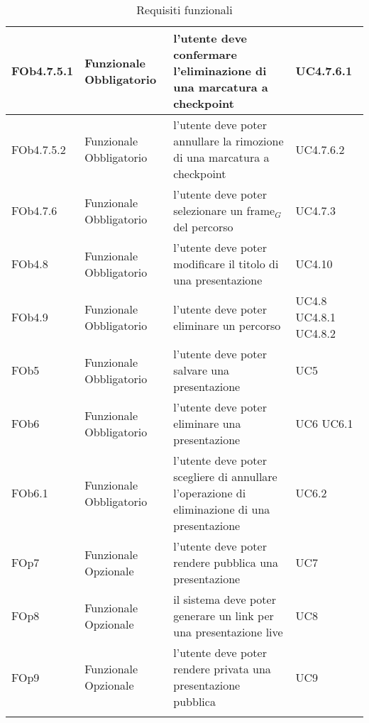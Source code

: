 \begin{longtable}{|l|p{2.5cm}|p{5cm}|p{3.5cm}|}
\hline
FOb4.7.5.1 & Funzionale \linebreak Obbligatorio & l'utente deve confermare l'eliminazione di una marcatura a checkpoint & UC4.7.6.1 \linebreak  \\
\hline
FOb4.7.5.2 & Funzionale \linebreak Obbligatorio & l'utente deve poter annullare la rimozione di una marcatura a checkpoint & UC4.7.6.2 \linebreak  \\
\hline
FOb4.7.6 & Funzionale \linebreak Obbligatorio & l'utente deve poter selezionare un frame$_G$ del percorso & UC4.7.3 \linebreak  \\
\hline
FOb4.8 & Funzionale \linebreak Obbligatorio & l'utente deve poter modificare il titolo di una presentazione & UC4.10 \linebreak  \\
\hline
FOb4.9 & Funzionale \linebreak Obbligatorio & l'utente deve poter eliminare un percorso & UC4.8 \linebreak  UC4.8.1 \linebreak  UC4.8.2 \linebreak  \\
\hline
FOb5 & Funzionale \linebreak Obbligatorio & l'utente deve poter salvare una presentazione & UC5 \linebreak \\
\hline
FOb6 & Funzionale \linebreak Obbligatorio & l'utente deve poter eliminare una presentazione & UC6 \linebreak UC6.1 \linebreak \\
\hline
FOb6.1 & Funzionale \linebreak Obbligatorio & l'utente deve poter scegliere di annullare l'operazione di eliminazione di una presentazione & UC6.2 \linebreak  \\
\hline
FOp7 & Funzionale \linebreak Opzionale & l'utente deve poter rendere pubblica una presentazione & UC7 \linebreak \\
\hline
FOp8 & Funzionale \linebreak Opzionale & il sistema deve poter generare un link per una presentazione live & UC8 \linebreak \\
\hline
FOp9 & Funzionale \linebreak Opzionale & l'utente deve poter rendere privata una presentazione pubblica & UC9 \linebreak \\
\hline
\caption{Requisiti funzionali}
\end{longtable}
